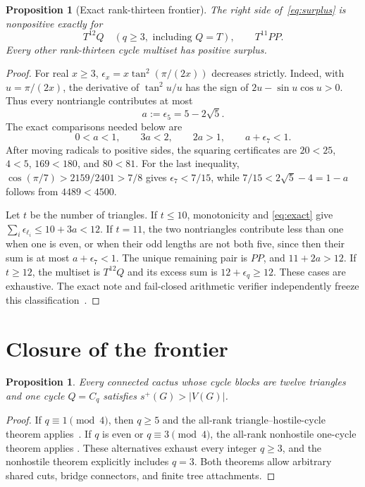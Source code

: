 \documentclass[11pt]{article}
\newtheorem{proposition}[theorem]{Proposition}
\newcommand{\splus}{s^+}
\begin{document}
\begin{proposition}[Exact rank-thirteen frontier]\label{prop:frontier}
The right side of~\eqref{eq:surplus} is nonpositive exactly for
\[
 \boxed{T^{12}Q}\quad(q\geq3,\text{ including }Q=T),
 \qquad
 \boxed{T^{11}PP}.
\]
Every other rank-thirteen cycle multiset has positive surplus.
\end{proposition}

\begin{proof}
For real $x\geq3$, $\epsilon_x=x\tan^2(\pi/(2x))$ decreases strictly.  Indeed,
with $u=\pi/(2x)$, the derivative of $\tan^2u/u$ has the sign of
$2u-\sin u\cos u>0$.  Thus every nontriangle contributes at most
\[
 a:=\epsilon_5=5-2\sqrt5.
\]
The exact comparisons needed below are
\begin{equation}\label{eq:exact}
 0<a<1,\qquad3a<2,\qquad2a>1,
 \qquad a+\epsilon_7<1.
\end{equation}
After moving radicals to positive sides, the squaring certificates are
$20<25$, $4<5$, $169<180$, and $80<81$.  For the last inequality,
$\cos(\pi/7)>2159/2401>7/8$ gives $\epsilon_7<7/15$, while
$7/15<2\sqrt5-4=1-a$ follows from $4489<4500$.

Let $t$ be the number of triangles.  If $t\leq10$, monotonicity and
\eqref{eq:exact} give
$\sum_i\epsilon_{\ell_i}\leq10+3a<12$.  If $t=11$, the two nontriangles
contribute less than one when one is even, or when their odd lengths are not
both five, since then their sum is at most $a+\epsilon_7<1$.  The unique
remaining pair is $PP$, and $11+2a>12$.  If $t\geq12$, the multiset is
$T^{12}Q$ and its excess sum is $12+\epsilon_q\geq12$.  These cases are
exhaustive.  The exact note and fail-closed arithmetic verifier independently
freeze this classification~\cite{Frontier}.
\end{proof}

\section{Closure of the frontier}

\begin{proposition}\label{prop:onecycle}
Every connected cactus whose cycle blocks are twelve triangles and one cycle
$Q=C_q$ satisfies $\splus(G)>|V(G)|$.
\end{proposition}

\begin{proof}
If $q\equiv1\pmod4$, then $q\geq5$ and the all-rank
triangle--hostile-cycle theorem applies~\cite{Hostile}.  If $q$ is even or
$q\equiv3\pmod4$, the all-rank nonhostile one-cycle theorem applies
\cite{Nonhostile}.  These alternatives exhaust every integer $q\geq3$, and the
nonhostile theorem explicitly includes $q=3$.  Both theorems allow arbitrary
shared cuts, bridge connectors, and finite tree attachments.
\end{proof}
\end{document}
